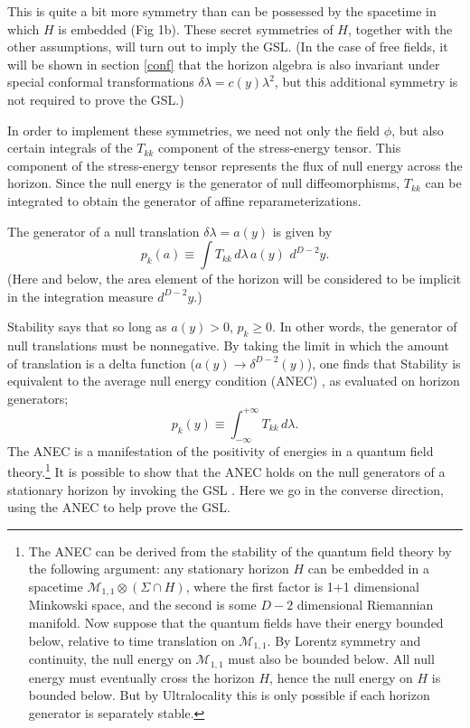 \documentclass{article}
\begin{document}
This is quite a bit more symmetry than can be possessed by the spacetime in which $H$ is embedded (Fig 1b).  These secret symmetries of $H$, together with the other assumptions, will turn out to imply the GSL.  (In the case of free fields, it will be shown in section \ref{conf} that the horizon algebra is also invariant under special conformal transformations $\delta \lambda = c(y) \lambda^2$, but this additional symmetry is not required to prove the GSL.)

In order to implement these symmetries, we need not only the field $\phi$, but also certain integrals of the $T_{kk}$ component of the stress-energy tensor.  This component of the stress-energy tensor represents the flux of null energy across the horizon.  Since the null energy is the generator of null diffeomorphisms, $T_{kk}$ can be integrated to obtain the generator of affine reparameterizations.

The generator of a null translation $\delta \lambda = a(y)$ is given by
\begin{equation}\label{pka}
p_k(a) \equiv \int T_{kk}\,d\lambda\,a(y)\,\,d^{D-2}y.
\end{equation}
(Here and below, the area element of the horizon will be considered to be implicit in the integration measure $d^{D-2}y$.)

Stability says that so long as $a(y) > 0$, $p_k \ge 0$.  In other words, the generator of null translations must be nonnegative.  By taking the limit in which the amount of translation is a delta function ($a(y) \to \delta^{D-2}(y)$), one finds that Stability is equivalent to the average null energy condition (ANEC) \cite{borde87}, as evaluated on horizon generators;
\begin{equation}
p_k(y) \equiv \int_{-\infty}^{+\infty} T_{kk}\,d\lambda.
\end{equation}
The ANEC is a manifestation of the positivity of energies in a quantum field theory.\footnote{The ANEC can be derived from the stability of the quantum field theory by the following argument: any stationary horizon $H$ can be embedded in a spacetime $\mathcal{M}_{1,1} \otimes (\Sigma \cap H)$, where the first factor is 1+1 dimensional Minkowski space, and the second is some $D-2$ dimensional Riemannian manifold.  Now suppose that the quantum fields have their energy bounded below, relative to time translation on $\mathcal{M}_{1,1}$.  By Lorentz symmetry and continuity, the null energy on $\mathcal{M}_{1,1}$ must also be bounded below.  All null energy must eventually cross the horizon $H$, hence the null energy on $H$ is bounded below.  But by Ultralocality this is only possible if each horizon generator is separately stable.}   It is possible to show that the ANEC holds on the null generators of a stationary horizon by invoking the GSL \cite{anec}.  Here we go in the converse direction, using the ANEC to help prove the GSL.
\end{document}
